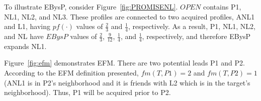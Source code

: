 \documentclass[journal]{IEEEtran}
\begin{document}



To illustrate  EBysP, consider Figure~\ref{fig:PROMISENL}. $OPEN$ contains P1,
NL1, NL2, and NL3. These profiles are connected to two acquired profiles, ANL1
and L1, having $pf(\cdot)$ values of $\frac{2}{3}$ and $\frac{1}{4}$, respectively. As a result, P1, NL1, NL2, and NL have $EBysP$ values of
$\frac{2}{3}$, $\frac{9}{12}$, $\frac{1}{4}$, and $\frac{1}{4}$, respectively, and therefore EBysP expands NL1.







Figure~\ref{fig:efm} demonstrates EFM. There are two potential leads P1 and P2. According to the EFM definition presented, $fm(T,P1)=2$ and  $fm(T,P2)=1$ (ANL1 is in P2's neighborhood and it is friends with L2 which is in the target's neighborhood). Thus, P1 will be acquired prior to P2.

\end{document}
